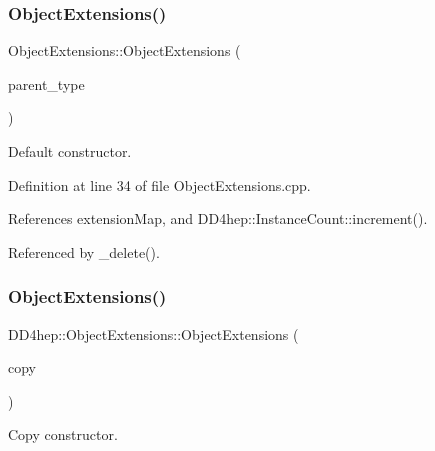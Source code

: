 \subsubsection{\texorpdfstring{Object\+Extensions()}{ObjectExtensions()}\hspace{0.1cm}{\footnotesize\ttfamily [1/2]}}
{\footnotesize\ttfamily Object\+Extensions\+::\+Object\+Extensions (\begin{DoxyParamCaption}\item[{const std\+::type\+\_\+info \&}]{parent\+\_\+type }\end{DoxyParamCaption})}



Default constructor. 



Definition at line 34 of file Object\+Extensions.\+cpp.



References extension\+Map, and D\+D4hep\+::\+Instance\+Count\+::increment().



Referenced by \+\_\+delete().

\hypertarget{class_d_d4hep_1_1_object_extensions_a886c0dbb21356036ebf0198e27950572}{}\label{class_d_d4hep_1_1_object_extensions_a886c0dbb21356036ebf0198e27950572} 
\subsubsection{\texorpdfstring{Object\+Extensions()}{ObjectExtensions()}\hspace{0.1cm}{\footnotesize\ttfamily [2/2]}}
{\footnotesize\ttfamily D\+D4hep\+::\+Object\+Extensions\+::\+Object\+Extensions (\begin{DoxyParamCaption}\item[{const \hyperlink{class_d_d4hep_1_1_object_extensions}{Object\+Extensions} \&}]{copy }\end{DoxyParamCaption})\hspace{0.3cm}{\ttfamily [delete]}}



Copy constructor. 

\hypertarget{class_d_d4hep_1_1_object_extensions_a95f9b15025fc24b02bbda235ed888f4d}{}\label{class_d_d4hep_1_1_object_extensions_a95f9b15025fc24b02bbda235ed888f4d} 
